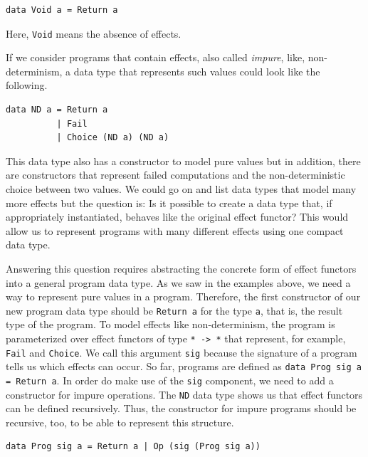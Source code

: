 \documentclass[a4paper, 11pt, fleqn, twoside]{scrreprt}
\begin{document}
\begin{verbatim}
data Void a = Return a
\end{verbatim}

Here, \texttt{Void} means the absence of effects. 

If we consider programs that contain effects, also called \textit{impure}, 
like, non-determinism, a data type that represents such values could look like 
the following.

\begin{verbatim}
data ND a = Return a
          | Fail
          | Choice (ND a) (ND a)
\end{verbatim}

This data type also has a constructor to model pure values but in addition, 
there are constructors that represent failed computations and the 
non-deterministic choice between two values. We could go on and list data types 
that model many more effects but the question is: Is it possible to create a 
data type that, if appropriately instantiated, behaves like the original effect 
functor? This would allow us to represent programs with many different effects 
using one compact data type.

Answering this question requires abstracting the concrete form of effect 
functors into a general program data type. As we saw in the examples above, we 
need a way to represent pure values in a program. Therefore, the first 
constructor of our new program data type should be \texttt{Return 
a} for the type \texttt{a}, that is, the result type of the 
program. To model effects like non-determinism, the program is parameterized 
over effect functors of type \texttt{* -> *} that represent, for 
example, \texttt{Fail} and \texttt{Choice}. We call 
this argument \texttt{sig} because the signature of a program 
tells us which effects can occur. So far, programs are defined as 
\texttt{data Prog sig a = Return a}. In order do make use of the 
\texttt{sig} component, we need to add a constructor for impure 
operations. The \texttt{ND} data type shows us that effect 
functors can be defined recursively. Thus, the constructor for impure programs 
should be recursive, too, to be able to represent this structure.

\begin{verbatim}
data Prog sig a = Return a | Op (sig (Prog sig a))
\end{verbatim}
\end{document}
